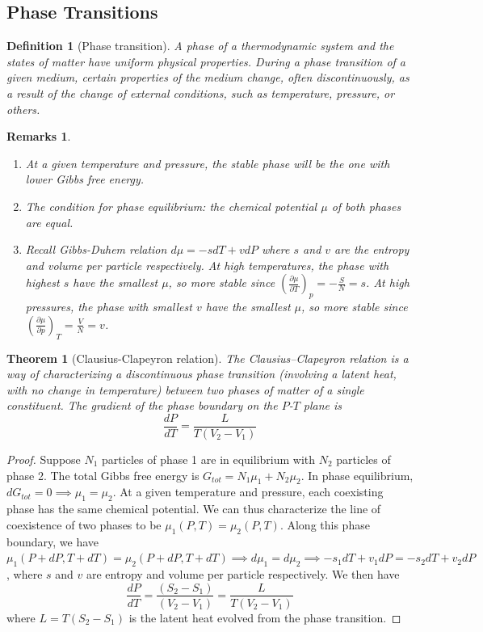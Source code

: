 \documentclass[a4paper]{article}
\newtheorem{remarks}{Remarks}[section]
\theoremstyle{new}
\newtheorem{defi}{Definition}[section]
\newtheorem{thm}{Theorem}[section]
\begin{document}
\subsection{Phase Transitions}
\begin{defi}[Phase transition]
A phase of a thermodynamic system and the states of matter have uniform physical properties. During a phase transition of a given medium, certain properties of the medium change, often discontinuously, as a result of the change of external conditions, such as temperature, pressure, or others.
\end{defi}
\begin{remarks}\leavevmode
\begin{enumerate}
    \item At a given temperature and pressure, the stable phase will be the one with lower Gibbs free energy.
    \item The condition for phase equilibrium: the chemical potential $\mu$ of both phases are equal.
    \item Recall Gibbs-Duhem relation $d\mu=-sdT+vdP$ where $s$ and $v$ are the entropy and volume per particle respectively. At high temperatures, the phase with highest $s$ have the smallest $\mu$, so more stable since $(\frac{\partial\mu}{\partial T})_p=-\frac{S}{N}=s$. At high pressures, the phase with smallest $v$ have the smallest $\mu$, so more stable since $(\frac{\partial\mu}{\partial p})_T=\frac{V}{N}=v$. 
\end{enumerate}
\end{remarks}
\begin{thm}[Clausius-Clapeyron relation]
The Clausius–Clapeyron relation is a way of characterizing a discontinuous phase transition (involving a latent heat, with no change in temperature) between two phases of matter of a single constituent. The gradient of the phase boundary on the $P$-$T$ plane is
$$\frac{dP}{dT}=\frac{L}{T(V_2-V_1)}$$
\end{thm}
\begin{proof}
Suppose $N_1$ particles of phase 1 are in equilibrium with $N_2$ particles of phase 2. The total Gibbs free energy is $G_{tot}=N_1\mu_1+N_2\mu_2$. In phase equilibrium, $dG_{tot}=0\implies\mu_1=\mu_2$. At a given temperature and pressure, each coexisting phase has the same chemical potential. We can thus characterize the line of coexistence of two phases to be $\mu_1(P,T)=\mu_2(P,T)$. Along this phase boundary, we have $\mu_1(P+dP,T+dT)=\mu_2(P+dP,T+dT)\implies d\mu_1=d\mu_2\implies -s_1dT+v_1dP=-s_2dT+v_2dP$, where $s$ and $v$ are entropy and volume per particle respectively. We then have 
$$\frac{dP}{dT}=\frac{(S_2-S_1)}{(V_2-V_1)}=\frac{L}{T(V_2-V_1)}$$
where $L=T(S_2-S_1)$ is the latent heat evolved from the phase transition.
\end{proof}
\end{document}
